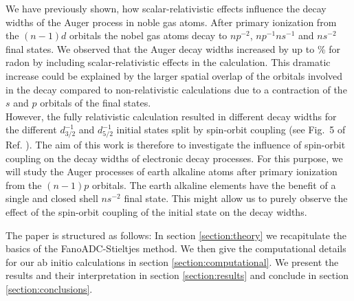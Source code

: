 We have previously shown, how
scalar-relativistic effects influence the decay widths of the Auger process in
noble gas atoms. After primary ionization from the $(n-1)d$ orbitals the nobel
gas atoms decay to $np^{-2}$, $np^{-1}ns^{-1}$ and $ns^{-2}$ final states.
We observed that the Auger decay widths increased by up to \unit[326]{\%}
for radon
by including scalar-relativistic effects in the calculation. This
dramatic increase could be explained by the larger spatial
overlap of the orbitals
involved in the decay compared to non-relativistic calculations due to
a contraction of the $s$ and $p$ orbitals of the final states.\\
However, the fully relativistic calculation resulted in different decay widths
for the different $d_{3/2}^{-1}$ and $d_{5/2}^{-1}$ initial states split by
spin-orbit coupling (see Fig.~5 of Ref. \cite{Fasshauer15_1}).
The aim of this work is therefore to investigate the
influence of spin-orbit coupling on the decay widths of electronic decay processes.
For this purpose, we will study the Auger processes of earth alkaline atoms
after primary ionization from the $(n-1)p$ orbitals. The earth alkaline elements
have the benefit of a single and closed shell $ns^{-2}$ final state.
This might allow us to purely observe the effect of the spin-orbit coupling of the
initial state on the decay widths.

The paper is structured as follows:
In section \ref{section:theory} we recapitulate the basics of the
FanoADC-Stieltjes method. We then give the computational details for our
ab initio calculations in section \ref{section:computational}. We present the
results and their interpretation in section \ref{section:results}
and conclude in section \ref{section:conclusions}.
